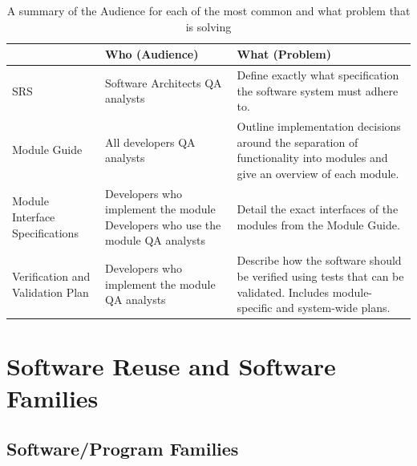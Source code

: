 \begin{table}[h]
\caption{A summary of the Audience for each of the most common \sfs{} and what 
problem that \sf{} is solving}
\label{tab:sfsummary}
\begin{tabular}{| P{.3\linewidth} | p{.3\linewidth}  | p{.3\linewidth} |}
\hline
 \SF{} & Who (Audience) & What (Problem)
\\ \hline
	SRS & 

	Software Architects \newline \newline
	QA analysts & 

	Define exactly what specification the software system must adhere to. 
\\ \hline
	Module Guide & 

	All developers \newline \newline
	QA analysts  & 

	Outline implementation decisions around the separation of functionality 
	into modules and give an overview of each module.
\\ \hline
	Module Interface Specifications & 

	Developers who implement the module \newline \newline
	Developers who use the module \newline \newline
	QA analysts & 

	Detail the exact interfaces of the modules from the Module Guide.
\\ \hline
	Verification and Validation Plan &
	
	Developers who implement the module \newline \newline
	QA analysts &

	Describe how the software should be verified using tests that can be 
	validated. Includes module-specific and system-wide plans.
\\ \hline
\end{tabular}
\end{table}

\section{Software Reuse and Software Families}
\subsection{Software/Program Families}

